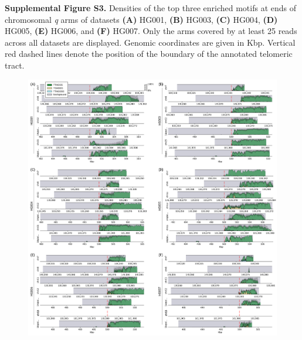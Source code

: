 \documentclass{article}
\begin{document}

\begin{samepage}
\noindent \textbf{Supplemental Figure S3.}
Densities of the top three enriched motifs at ends of chromosomal \textit{q} arms of datasets
\textbf{(A)} HG001,
\textbf{(B)} HG003,
\textbf{(C)} HG004,
\textbf{(D)} HG005,
\textbf{(E)} HG006, and
\textbf{(F)} HG007.
Only the arms covered by at least 25 reads across all datasets are displayed.
Genomic coordinates are given in Kbp.
Vertical red dashed lines denote the position of the boundary of the annotated telomeric tract.

\begin{figure}[ht!] \centering
\includegraphics[width=\textwidth,keepaspectratio]{Figure_S3-nolegend.pdf}
\end{figure}
\end{samepage}
\end{document}
